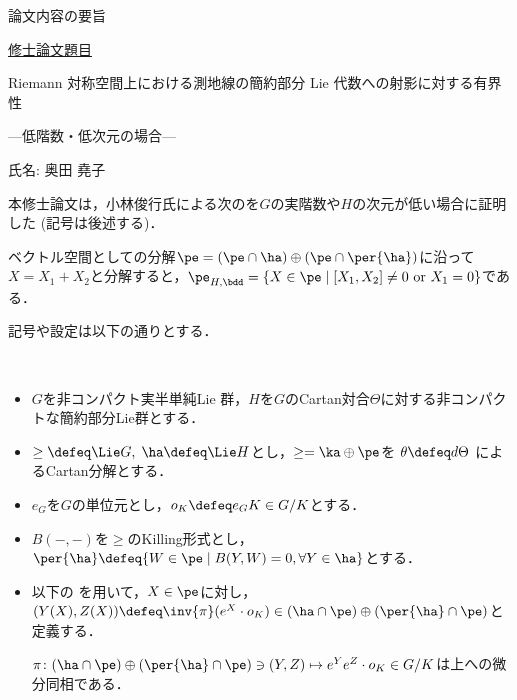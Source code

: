 \documentclass[12pt,dvipdfmx,uplatex]{jsarticle}
\begin{document}
% 
\begin{center}
論文内容の要旨
\end{center}

\noindent\underline{修士論文題目}

\begin{center}
Riemann 対称空間上における測地線の簡約部分 Lie 代数への射影に対する有界性

---低階数・低次元の場合---
\end{center}

\noindent 氏名: 奥田 堯子

\vspace{1em}

本修士論文は，小林俊行氏による次のを$G$の実階数や$H$の次元が低い場合に証明した (記号は後述する)．

\begin{yosou}\label{yosou:1121}
  
  ベクトル空間としての分解$\pe =(\pe\cap \ha)\oplus(\pe\cap\per{\ha}) $に沿って$X = X_1 + X_2 $と分解すると，$\pe_{H,\bdd} = \{X\in \pe\mid [X_1, X_2]\neq 0 \text{ or } X_1 = 0 \}$である．
\end{yosou}

記号や設定は以下の通りとする．
\begin{nttdef}\textcolor{white}{hoge}

  \begin{itemize}
  \item $G$を非コンパクト実半単純Lie 群，$H$を$G$のCartan対合$\Theta$に対する非コンパクトな簡約部分Lie群とする．
  \item $\ge \defeq \Lie G,\; \ha \defeq \Lie H$とし，$\ge = \ka\oplus \pe$を $\theta \defeq d\Theta$ によるCartan分解とする．
  \item  $e_G$を$G$の単位元とし，$o_K \defeq e_GK\in G/K$とする．
  \item $B({-}, {-}) $を$\ge$のKilling形式とし，$\per{\ha} \defeq \{W\in \pe\mid B(Y, W) = 0 ,\forall Y\in \ha\} $とする．
  \item 以下の  を用いて，$X\in \pe$に対し，$(Y(X), Z(X))\defeq \inv{\pi}(e^X\cdot o_K)\in (\ha\cap\pe)\oplus (\per{\ha}\cap \pe)$と定義する．
    \begin{thm}\cite[Lemma~6.1]{kob89}\label{thm:kob89-lem6.1}

      $\pi\colon  (\ha\cap\pe)\oplus (\per{\ha}\cap \pe) \ni (Y, Z)\mapsto e^{Y}e^{Z}\cdot o_K \in G/K $は上への微分同相である．
    \end{thm}

  \end{itemize}
  
\end{nttdef}



\begin{thebibliography}{99}
\end{thebibliography}
\end{document}
